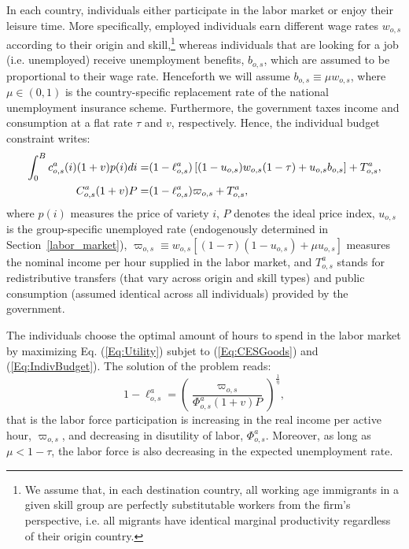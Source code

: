 \documentclass[a4paper,12pt]{article}
\begin{document}
In each country, individuals either participate in the labor market or enjoy
their leisure time. More specifically, employed individuals earn different
wage rates $w_{o,s}$ according to their origin and skill,\footnote{%
We assume that, in each destination country, all working age immigrants in a
given skill group are perfectly substitutable workers from the firm's
perspective, i.e. all migrants have identical marginal productivity
regardless of their origin country.} whereas individuals that are looking
for a job (i.e. unemployed) receive unemployment benefits, $b_{o,s}$, which
are assumed to be proportional to their wage rate. Henceforth we will assume 
$b_{o,s}\equiv \mu w_{o,s}$, where $\mu \in (0,1)$ is the country-specific
replacement rate of the national unemployment insurance scheme. Furthermore,
the government taxes income and consumption at a flat rate $\tau $ and $v$,
respectively. Hence, the individual budget constraint writes: 
\begin{align}
\int_{0}^{B}c_{o,s}^{a}(i)(1+v)p(i)di=& (1-\ell _{o,s}^{a})\left[
(1-u_{o,s})w_{o,s}(1-\tau )+u_{o,s}b_{o,s}\right] +T_{o,s}^{a},  \notag \\
C_{o,s}^{a}(1+v)P=& (1-\ell _{o,s}^{a})\varpi _{o,s}+T_{o,s}^{a},
\label{Eq:IndivBudget}
\end{align}
\sloppy where $p(i)$ measures the price of variety $i$, $P$ denotes the ideal price
index, $u_{o,s}$ is the group-specific unemployed rate (endogenously
determined in Section~\ref{labor_market}), $\varpi _{o,s}\equiv w_{o,s}\left[ (1-\tau
)(1-u_{o,s})+\mu u_{o,s}\right]$ measures the nominal income per hour
supplied in the labor market, and $T_{o,s}^{a}$ stands for redistributive
transfers (that vary across origin and skill types) and public consumption
(assumed identical across all individuals) provided by the government.

The individuals choose the optimal amount of hours to spend in the labor
market by maximizing Eq. (\ref{Eq:Utility}) subjet to (\ref{Eq:CESGoods})
and (\ref{Eq:IndivBudget}). The solution of the problem reads: 
\begin{equation}
1-\ell _{o,s}^{a}=\left( \frac{\varpi _{o,s}}{\Phi _{o,s}^{a}(1+v)P}\right)
^{\frac{1}{\eta }},  \label{Eq:labSupply}
\end{equation}%
that is the labor force participation is increasing in the real income per
active hour, $\varpi _{o,s}$, and decreasing in disutility of labor, $\Phi^a_{o,s}$. Moreover, as long as $\mu <1-\tau $, the labor force is also
decreasing in the expected unemployment rate.
\end{document}
